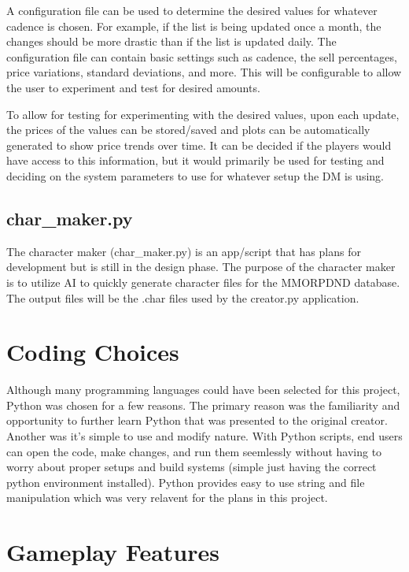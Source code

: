 A configuration file can be used to determine the desired values for whatever cadence is chosen. For example, if the list is being updated once a month, the changes should be more drastic than if the list is updated daily. The configuration file can contain basic settings such as cadence, the sell percentages, price variations, standard deviations, and more. This will be configurable to allow the user to experiment and test for desired amounts.

To allow for testing for experimenting with the desired values, upon each update, the prices of the values can be stored/saved and plots can be automatically generated to show price trends over time. It can be decided if the players would have access to this information, but it would primarily be used for testing and deciding on the system parameters to use for whatever setup the DM is using.




\subsection{char\_maker.py}

The character maker (char\_maker.py) is an app/script that has plans for development but is still in the design phase. The purpose of the character maker is to utilize AI to quickly generate character files for the MMORPDND database. The output files will be the .char files used by the creator.py application.

\section{Coding Choices}

Although many programming languages could have been selected for this project, Python was chosen for a few reasons. The primary reason was the familiarity and opportunity to further learn Python that was presented to the original creator. Another was it's simple to use and modify nature. With Python scripts, end users can open the code, make changes, and run them seemlessly without having to worry about proper setups and build systems (simple just having the correct python environment installed). Python provides easy to use string and file manipulation which was very relavent for the plans in this project. 


\section{Gameplay Features}

